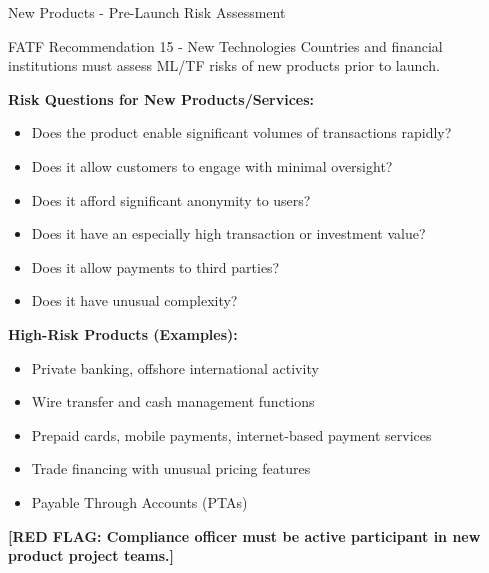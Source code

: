 \documentclass[11pt,a4paper]{beamer}
\newcommand{\redflag}[1]{\textcolor{red!80!black}{\textbf{[RED FLAG: #1]}}}
\begin{document}
	\begin{frame}{New Products - Pre-Launch Risk Assessment}
		\begin{block}{FATF Recommendation 15 - New Technologies}
			Countries and financial institutions must assess ML/TF risks of new products prior to launch.
		\end{block}
		\textbf{Risk Questions for New Products/Services:}
		\begin{itemize}
			\item Does the product enable significant volumes of transactions rapidly?
			\item Does it allow customers to engage with minimal oversight?
			\item Does it afford significant anonymity to users?
			\item Does it have an especially high transaction or investment value?
			\item Does it allow payments to third parties?
			\item Does it have unusual complexity?
		\end{itemize}
		\textbf{High-Risk Products (Examples):}
		\begin{itemize}
			\item Private banking, offshore international activity
			\item Wire transfer and cash management functions
			\item Prepaid cards, mobile payments, internet-based payment services
			\item Trade financing with unusual pricing features
			\item Payable Through Accounts (PTAs)
		\end{itemize}
		\redflag{Compliance officer must be active participant in new product project teams.}
	\end{frame}
	
	
\end{document}
